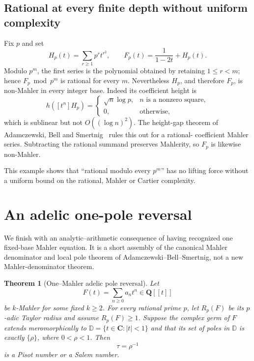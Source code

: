 \documentclass[11pt,reqno]{amsart}
\newtheorem{theorem}{Theorem}[section]
\theoremstyle{definition}
\theoremstyle{remark}
\newcommand{\Q}{\mathbf Q}
\newcommand{\C}{\mathbf C}
\begin{document}
\subsection{Rational at every finite depth without uniform complexity}
Fix $p$ and set
\begin{equation}\label{eq:hp}
 H_p(t)=\sum_{r\geq1}p^rt^{r^2},\qquad
 F_p(t)=\frac1{1-2t}+H_p(t).
\end{equation}
Modulo $p^m$, the first series is the polynomial obtained by retaining
$1\leq r<m$; hence $F_p\bmod p^m$ is rational for every $m$.
Nevertheless $H_p$, and therefore $F_p$, is non-Mahler in every integer
base.  Indeed its coefficient height is
\[
 h([t^n]H_p)=
 \begin{cases}
 \sqrt n\log p,&n\text{ is a nonzero square},\\
 0,&\text{otherwise},
 \end{cases}
\]
which is sublinear but not $O((\log n)^2)$.  The height-gap theorem of
Adamczewski, Bell and Smertnig~\cite{abs} rules this out for a rational-
coefficient Mahler series.  Subtracting the rational summand preserves
Mahlerity, so $F_p$ is likewise non-Mahler.

This example shows that ``rational modulo every $p^m$'' has no lifting force
without a uniform bound on the rational, Mahler or Cartier complexity.

\section{An adelic one-pole reversal}

We finish with an analytic--arithmetic consequence of having recognized one
fixed-base Mahler equation.  It is a short assembly of the canonical Mahler
denominator and local pole theorem of Adamczewski--Bell--Smertnig, not a new
Mahler-denominator theorem.

\begin{theorem}[One--Mahler adelic pole reversal]
\label{thm:pole-reversal}
Let
\[
 F(t)=\sum_{n\geq0}a_nt^n\in\Q[[t]]
\]
be $k$-Mahler for some fixed $k\geq2$.  For every rational prime $p$, let
$R_p(F)$ be its $p$-adic Taylor radius and assume $R_p(F)\geq1$.  Suppose
the complex germ of $F$ extends meromorphically to
$\mathbb D=\{t\in\C:|t|<1\}$ and that its set of poles in $\mathbb D$ is
exactly $\{\rho\}$, where $0<\rho<1$.  Then
\[
 \tau=\rho^{-1}
\]
is a Pisot number or a Salem number.
\end{theorem}
\end{document}
